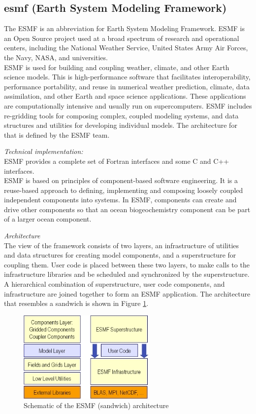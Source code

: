 \subsection{esmf (Earth System Modeling Framework)}
The ESMF is an abbreviation for Earth System Modeling Framework. ESMF is an Open Source project used at a broad spectrum of research and operational centers, including the National Weather Service, United States Army Air Forces, the Navy, NASA, and universities.\\
ESMF is used for building and coupling weather, climate, and other Earth science models. This is high-performance software that facilitates interoperability, performance portability, and reuse in numerical weather prediction, climate, data assimilation, and other Earth and space science applications. These applications are computationally intensive and usually run on supercomputers. ESMF includes re-gridding tools for composing complex, coupled modeling systems, and data structures and utilities for developing individual models. The architecture for that is defined by the ESMF team.

\emph{Technical implementation:}\\
ESMF provides a complete set of Fortran interfaces and some C and C++ interfaces.\\
ESMF is based on principles of component-based software engineering. It is a reuse-based approach to defining, implementing and composing loosely coupled independent components into systems. In ESMF, components can create and drive other components so that an ocean biogeochemistry component can be part of a larger ocean component.

\emph{Architecture}\\
The view of the framework consists of two layers, an infrastructure of utilities and data structures for creating model components, and a superstructure for coupling them. User code is placed between these two layers, to make calls to the infrastructure libraries and be scheduled and synchronized by the superstructure. A hierarchical combination of superstructure, user code components, and infrastructure are joined together to form an ESMF application. The architecture that resembles a sandwich is shown in Figure \ref{fig:Schematic of the ESMF (sandwich) architecture}.

\begin{figure}[htbp]
\centering
\includegraphics[width=0.6\textwidth]{pics/esmf/Figure1.png}
\caption{Schematic of the ESMF (sandwich) architecture}
\label{fig:Schematic of the ESMF (sandwich) architecture}
\end{figure}

